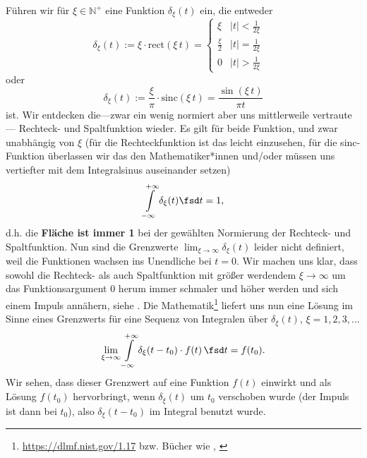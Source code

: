 \begin{Werkzeug}
Führen wir für $\xi\in\mathbb{N}^+$ eine Funktion $\delta_\xi(t)$ ein, die entweder
\begin{equation}
\delta_\xi(t) := \xi \cdot \mathrm{rect}(\xi \, t) =
\begin{cases} \xi & |t| < \frac{1}{2 \xi} \\ \frac{\xi}{2} & |t| = \frac{1}{2 \xi} \\ 0 & |t| > \frac{1}{2 \xi} \end{cases}\quad
\end{equation}
oder
\begin{equation}
\delta_\xi(t) := \frac{\xi}{\pi} \cdot \mathrm{sinc}(\xi \, t) = \frac{\sin(\xi \, t)}{\pi t}
\end{equation}
ist.
Wir entdecken die---zwar ein wenig normiert aber uns mittlerweile vertraute---
Rechteck- und Spaltfunktion wieder.
%
Es gilt für beide Funktion, und zwar unabhängig von $\xi$ (für die
Rechteckfunktion ist das leicht einzusehen, für die sinc-Funktion überlassen wir
das den Mathematiker*innen und/oder müssen uns vertiefter mit dem Integralsinus
auseinander setzen)
\begin{equation}
\int\limits_{-\infty}^{+\infty} \delta_\xi(t) \fsd t = 1,
\end{equation}
d.h. die \textbf{Fläche ist immer 1} bei der gewählten Normierung der
Rechteck- und Spaltfunktion.
%
Nun sind die Grenzwerte
$\lim_{\xi\to\infty} \delta_\xi(t)$
leider nicht definiert, weil die Funktionen wachsen ins Unendliche bei $t=0$.
%
Wir machen uns klar, dass sowohl die Rechteck- als auch Spaltfunktion mit
größer werdendem $\xi\to \infty$ um das Funktionsargument $0$ herum
immer schmaler und höher werden und sich
einem Impuls annähern, siehe .
%
Die Mathematik\footnote{\url{https://dlmf.nist.gov/1.17} bzw. Bücher wie
\cite[Kapitel 1.11]{Arfken2013}, \cite{Burg2013}}
liefert uns nun eine Lösung im Sinne eines Grenzwerts für eine
Sequenz von Integralen über $\delta_\xi(t)$, $\xi=1,2,3,...$
\begin{equation}
\lim_{\xi\to\infty} \int\limits_{-\infty}^{+\infty}
\delta_\xi(t-t_0) \cdot f(t) \, \fsd t = f(t_0).
\end{equation}
Wir sehen, dass dieser Grenzwert auf eine Funktion $f(t)$ einwirkt und als Lösung
$f(t_0)$ hervorbringt, wenn $\delta_\xi(t)$ um $t_0$ verschoben wurde (der Impuls ist dann bei $t_0$), also
$\delta_\xi(t-t_0)$ im Integral benutzt wurde.

\end{Werkzeug}
